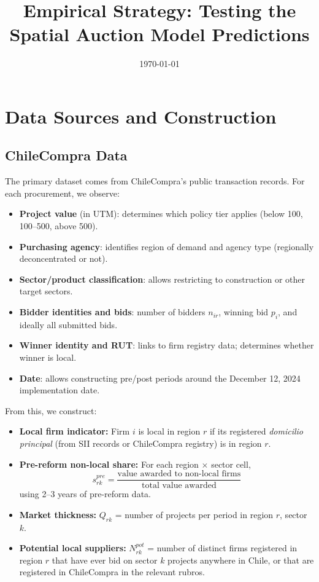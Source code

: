 \documentclass[12pt]{article}
\title{Empirical Strategy: Testing the Spatial Auction Model Predictions}
\author{}
\date{\today}
\begin{document}
\maketitle

\tableofcontents
\newpage

\section{Data Sources and Construction}

\subsection{ChileCompra Data}

The primary dataset comes from ChileCompra's public transaction records. For each procurement, we observe:

\begin{itemize}[itemsep=4pt]
    \item \textbf{Project value} (in UTM): determines which policy tier applies (below 100, 100--500, above 500).
    \item \textbf{Purchasing agency}: identifies region of demand and agency type (regionally deconcentrated or not).
    \item \textbf{Sector/product classification}: allows restricting to construction or other target sectors.
    \item \textbf{Bidder identities and bids}: number of bidders $n_{ir}$, winning bid $p_i$, and ideally all submitted bids.
    \item \textbf{Winner identity and RUT}: links to firm registry data; determines whether winner is local.
    \item \textbf{Date}: allows constructing pre/post periods around the December 12, 2024 implementation date.
\end{itemize}

\noindent From this, we construct:

\begin{itemize}[itemsep=4pt]
    \item \textbf{Local firm indicator:} Firm $i$ is local in region $r$ if its registered \emph{domicilio principal} (from SII records or ChileCompra registry) is in region $r$.
    \item \textbf{Pre-reform non-local share:} For each region $\times$ sector cell,
    \begin{equation}\label{eq:nonlocal_share}
        s_{rk}^{pre} = \frac{\text{value awarded to non-local firms}}{\text{total value awarded}}
    \end{equation}
    using 2--3 years of pre-reform data.
    \item \textbf{Market thickness:} $Q_{rk}$ = number of projects per period in region $r$, sector $k$.
    \item \textbf{Potential local suppliers:} $N_{rk}^{pot}$ = number of distinct firms registered in region $r$ that have ever bid on sector $k$ projects anywhere in Chile, or that are registered in ChileCompra in the relevant rubros.
\end{itemize}
\end{document}
